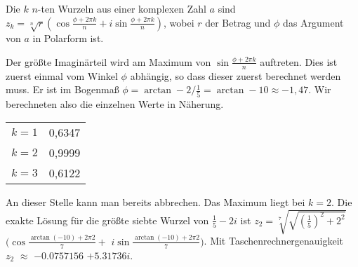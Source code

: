 \documentclass[a4paper,german,12pt]{article}
\begin{document}
Die $k$ $n$-ten Wurzeln aus einer komplexen Zahl $a$ sind $z_k
= \sqrt[n]{r} \left( \cos \frac{\phi + 2 \pi k}{n} + i \sin \frac{\phi + 2
\pi k}{n} \right)$, wobei $r$ der Betrag und $\phi$ das Argument von $a$ in
Polarform ist.

Der größte Imaginärteil wird am Maximum von $\sin \frac{\phi + 2 \pi k}{n}$
auftreten. Dies ist zuerst einmal vom Winkel $\phi$ abhängig, so dass dieser
zuerst berechnet werden muss. Er ist im Bogenmaß $\phi = \arctan -2/\frac{1}{5}
= \arctan -10 \approx -1,47$. Wir berechneten also die einzelnen Werte in
Näherung.

\begin{table}[H]
\begin{tabular}{|c|c|}
$k=1$ & 0,6347 \\
$k=2$ & 0,9999 \\
$k=3$ & 0,6122
\end{tabular}
\end{table}

An dieser Stelle kann man bereits abbrechen. Das Maximum liegt bei $k=2$. Die
exakte Lösung für die größte siebte Wurzel von $\frac{1}{5} - 2i$ ist $z_2 =
\sqrt[7]{\sqrt{(\frac{1}{5})^2+2^2}}$ $(\cos \frac{\arctan(-10) + 2 \pi
2}{7} +$ $i \sin \frac{\arctan(-10) + 2 \pi 2}{7})$. Mit
Taschenrechnergenauigkeit \\ $z_2$ $\approx$ $-0.0757156$ $ + 5.31736i$.
\end{document}
